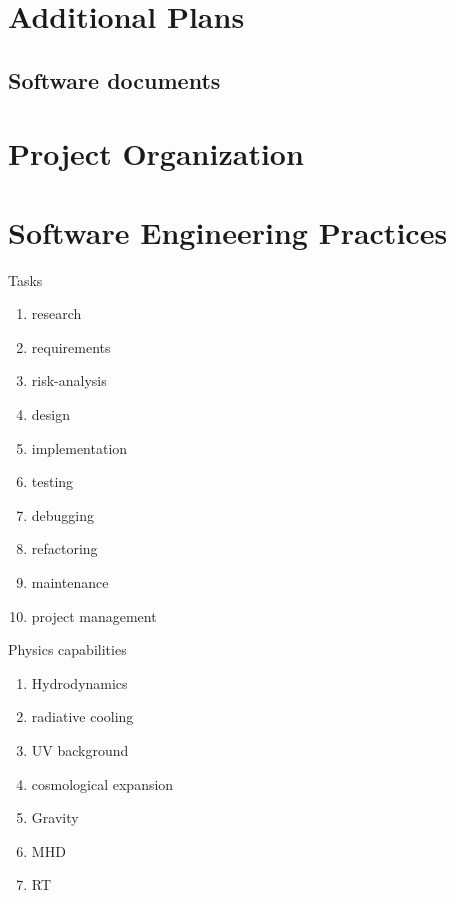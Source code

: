 \documentclass{article}[12pt]
\begin{document}
\section{Additional Plans} \label{s:Additional Plans}



\subsection{Software documents}


\section{Project Organization} \label{s:intro}

\section{Software Engineering Practices}


Tasks

\begin{enumerate}
\item research
\item requirements
\item risk-analysis
\item design
\item implementation
\item testing
\item debugging
\item refactoring
\item maintenance
\item project management
\end{enumerate}

Physics capabilities

\begin{enumerate}
\item Hydrodynamics
\item radiative cooling
\item UV background
\item cosmological expansion
\item Gravity
\item MHD
\item RT
\end{enumerate}
\end{document}
